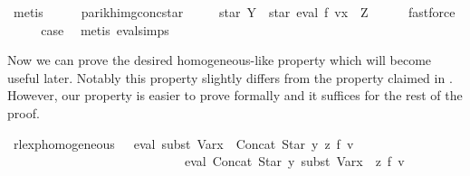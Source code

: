 \begin{isabellebody}
\ metis\isanewline
\ \ \isamarkupfalse%
\ \isamarkupfalse%
\ parikh{\isacharunderscore}{\kern0pt}img{\isacharunderscore}{\kern0pt}conc{\isacharunderscore}{\kern0pt}star\ \isamarkupfalse%
\ {\isachardoublequoteopen}{\isasymdots}\ {\isasymsubseteq}\ {\isasymPsi}\ {\isacharparenleft}{\kern0pt}star\ Y\ {\isacharat}{\kern0pt}{\isacharat}{\kern0pt}\ star\ {\isacharparenleft}{\kern0pt}eval\ f\ {\isacharparenleft}{\kern0pt}v{\isacharparenleft}{\kern0pt}x\ {\isacharcolon}{\kern0pt}{\isacharequal}{\kern0pt}\ Z{\isacharparenright}{\kern0pt}{\isacharparenright}{\kern0pt}{\isacharparenright}{\kern0pt}{\isacharparenright}{\kern0pt}{\isachardoublequoteclose}\isanewline
\ \ \ \ \isamarkupfalse%
\ fastforce\isanewline
\ \ \isamarkupfalse%
\ \isamarkupfalse%
\ {\isacharquery}{\kern0pt}case\ \isamarkupfalse%
\ {\isacharparenleft}{\kern0pt}metis\ eval{\isachardot}{\kern0pt}simps{\isacharparenleft}{\kern0pt}{}{\isacharparenright}{\kern0pt}{\isacharparenright}{\kern0pt}\isanewline
{}\isamarkupfalse%
%
\endisatagproof
{\isafoldproof}%
%
\isadelimproof
%
\endisadelimproof
%
\begin{isamarkuptext}%
Now we can prove the desired homogeneous-like property which will become useful later.
Notably this property slightly differs from the property claimed in \cite{Pilling}. However, our
property is easier to prove formally and it suffices for the rest of the proof.%
\end{isamarkuptext}\isamarkuptrue%
\isamarkupfalse%
\ rlexp{\isacharunderscore}{\kern0pt}homogeneous{\isacharcolon}{\kern0pt}\ \ {\isachardoublequoteopen}{\isasymPsi}\ {\isacharparenleft}{\kern0pt}eval\ {\isacharparenleft}{\kern0pt}subst\ {\isacharparenleft}{\kern0pt}Var{\isacharparenleft}{\kern0pt}x\ {\isacharcolon}{\kern0pt}{\isacharequal}{\kern0pt}\ Concat\ {\isacharparenleft}{\kern0pt}Star\ y{\isacharparenright}{\kern0pt}\ z{\isacharparenright}{\kern0pt}{\isacharparenright}{\kern0pt}\ f{\isacharparenright}{\kern0pt}\ v{\isacharparenright}{\kern0pt}\isanewline
\ \ \ \ \ \ \ \ \ \ \ \ \ \ \ \ \ \ \ \ \ \ \ \ \ \ {\isasymsubseteq}\ {\isasymPsi}\ {\isacharparenleft}{\kern0pt}eval\ {\isacharparenleft}{\kern0pt}Concat\ {\isacharparenleft}{\kern0pt}Star\ y{\isacharparenright}{\kern0pt}\ {\isacharparenleft}{\kern0pt}subst\ {\isacharparenleft}{\kern0pt}Var{\isacharparenleft}{\kern0pt}x\ {\isacharcolon}{\kern0pt}{\isacharequal}{\kern0pt}\ z{\isacharparenright}{\kern0pt}{\isacharparenright}{\kern0pt}\ f{\isacharparenright}{\kern0pt}{\isacharparenright}{\kern0pt}\ v{\isacharparenright}{\kern0pt}{\isachardoublequoteclose}\isanewline

\end{isabellebody}
